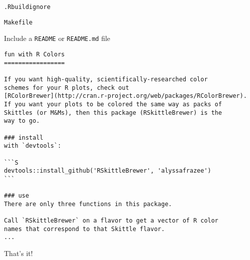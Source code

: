\documentclass[12pt,t]{beamer}
\begin{document}
\begin{frame}[fragile]{\tt .Rbuildignore}

\vspace{24pt}

\begin{lstlisting}
Makefile
\end{lstlisting}

\end{frame}


\begin{frame}[fragile]{Include a {\tt README} or {\tt README.md} file}

\vspace{6pt}

\begin{lstlisting}
fun with R Colors
=================

If you want high-quality, scientifically-researched color
schemes for your R plots, check out
[RColorBrewer](http://cran.r-project.org/web/packages/RColorBrewer).
If you want your plots to be colored the same way as packs of
Skittles (or M&Ms), then this package (RSkittleBrewer) is the
way to go.

### install
with `devtools`:

```S
devtools::install_github('RSkittleBrewer', 'alyssafrazee')
```

### use
There are only three functions in this package.

Call `RSkittleBrewer` on a flavor to get a vector of R color
names that correspond to that Skittle flavor.
...
\end{lstlisting}

\end{frame}


\begin{frame}[c]{}


\centerline{That's it!}

\end{frame}
\end{document}
